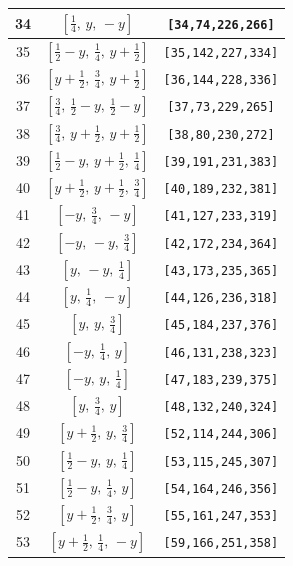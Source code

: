\documentclass[fleqn,8pt]{jsarticle}
\begin{document}
\begin{longtable}{ccc}
34 & $\left[ \frac{1}{4},\, y,\, - y \right]$ & {\tt [34,74,226,266]} \\ \hline
35 & $\left[ \frac{1}{2} - y,\, \frac{1}{4},\, y + \frac{1}{2} \right]$ & {\tt [35,142,227,334]} \\ \hline
36 & $\left[ y + \frac{1}{2},\, \frac{3}{4},\, y + \frac{1}{2} \right]$ & {\tt [36,144,228,336]} \\ \hline
37 & $\left[ \frac{3}{4},\, \frac{1}{2} - y,\, \frac{1}{2} - y \right]$ & {\tt [37,73,229,265]} \\ \hline
38 & $\left[ \frac{3}{4},\, y + \frac{1}{2},\, y + \frac{1}{2} \right]$ & {\tt [38,80,230,272]} \\ \hline
39 & $\left[ \frac{1}{2} - y,\, y + \frac{1}{2},\, \frac{1}{4} \right]$ & {\tt [39,191,231,383]} \\ \hline
40 & $\left[ y + \frac{1}{2},\, y + \frac{1}{2},\, \frac{3}{4} \right]$ & {\tt [40,189,232,381]} \\ \hline
41 & $\left[ - y,\, \frac{3}{4},\, - y \right]$ & {\tt [41,127,233,319]} \\ \hline
42 & $\left[ - y,\, - y,\, \frac{3}{4} \right]$ & {\tt [42,172,234,364]} \\ \hline
43 & $\left[ y,\, - y,\, \frac{1}{4} \right]$ & {\tt [43,173,235,365]} \\ \hline
44 & $\left[ y,\, \frac{1}{4},\, - y \right]$ & {\tt [44,126,236,318]} \\ \hline
45 & $\left[ y,\, y,\, \frac{3}{4} \right]$ & {\tt [45,184,237,376]} \\ \hline
46 & $\left[ - y,\, \frac{1}{4},\, y \right]$ & {\tt [46,131,238,323]} \\ \hline
47 & $\left[ - y,\, y,\, \frac{1}{4} \right]$ & {\tt [47,183,239,375]} \\ \hline
48 & $\left[ y,\, \frac{3}{4},\, y \right]$ & {\tt [48,132,240,324]} \\ \hline
49 & $\left[ y + \frac{1}{2},\, y,\, \frac{3}{4} \right]$ & {\tt [52,114,244,306]} \\ \hline
50 & $\left[ \frac{1}{2} - y,\, y,\, \frac{1}{4} \right]$ & {\tt [53,115,245,307]} \\ \hline
51 & $\left[ \frac{1}{2} - y,\, \frac{1}{4},\, y \right]$ & {\tt [54,164,246,356]} \\ \hline
52 & $\left[ y + \frac{1}{2},\, \frac{3}{4},\, y \right]$ & {\tt [55,161,247,353]} \\ \hline
53 & $\left[ y + \frac{1}{2},\, \frac{1}{4},\, - y \right]$ & {\tt [59,166,251,358]} \\ \hline

\end{longtable}
\end{document}
